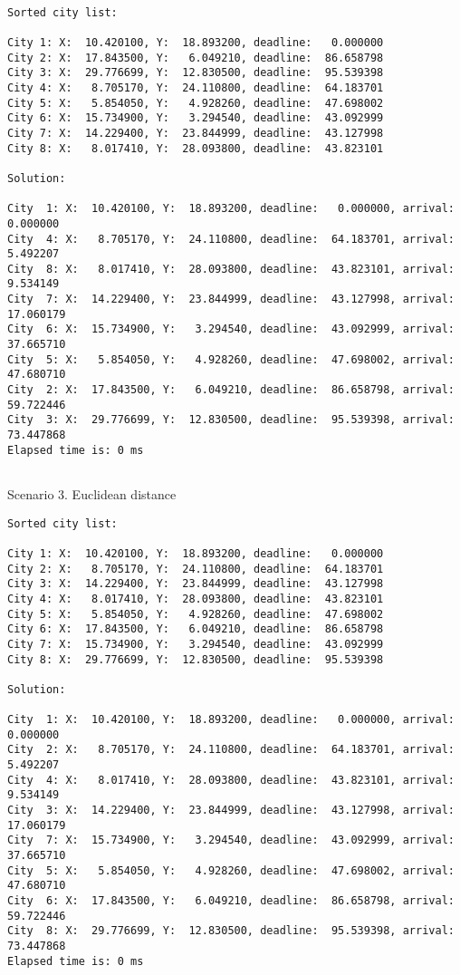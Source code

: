 \documentclass[a4paper, 12pt]{article}
\begin{document}
\begin{lstlisting}

Sorted city list:

City 1: X:  10.420100, Y:  18.893200, deadline:   0.000000
City 2: X:  17.843500, Y:   6.049210, deadline:  86.658798
City 3: X:  29.776699, Y:  12.830500, deadline:  95.539398
City 4: X:   8.705170, Y:  24.110800, deadline:  64.183701
City 5: X:   5.854050, Y:   4.928260, deadline:  47.698002
City 6: X:  15.734900, Y:   3.294540, deadline:  43.092999
City 7: X:  14.229400, Y:  23.844999, deadline:  43.127998
City 8: X:   8.017410, Y:  28.093800, deadline:  43.823101

Solution: 

City  1: X:  10.420100, Y:  18.893200, deadline:   0.000000, arrival:   0.000000
City  4: X:   8.705170, Y:  24.110800, deadline:  64.183701, arrival:   5.492207
City  8: X:   8.017410, Y:  28.093800, deadline:  43.823101, arrival:   9.534149
City  7: X:  14.229400, Y:  23.844999, deadline:  43.127998, arrival:  17.060179
City  6: X:  15.734900, Y:   3.294540, deadline:  43.092999, arrival:  37.665710
City  5: X:   5.854050, Y:   4.928260, deadline:  47.698002, arrival:  47.680710
City  2: X:  17.843500, Y:   6.049210, deadline:  86.658798, arrival:  59.722446
City  3: X:  29.776699, Y:  12.830500, deadline:  95.539398, arrival:  73.447868
Elapsed time is: 0 ms


\end{lstlisting}

Scenario 3. Euclidean distance

\begin{lstlisting}
Sorted city list:

City 1: X:  10.420100, Y:  18.893200, deadline:   0.000000
City 2: X:   8.705170, Y:  24.110800, deadline:  64.183701
City 3: X:  14.229400, Y:  23.844999, deadline:  43.127998
City 4: X:   8.017410, Y:  28.093800, deadline:  43.823101
City 5: X:   5.854050, Y:   4.928260, deadline:  47.698002
City 6: X:  17.843500, Y:   6.049210, deadline:  86.658798
City 7: X:  15.734900, Y:   3.294540, deadline:  43.092999
City 8: X:  29.776699, Y:  12.830500, deadline:  95.539398

Solution: 

City  1: X:  10.420100, Y:  18.893200, deadline:   0.000000, arrival:   0.000000
City  2: X:   8.705170, Y:  24.110800, deadline:  64.183701, arrival:   5.492207
City  4: X:   8.017410, Y:  28.093800, deadline:  43.823101, arrival:   9.534149
City  3: X:  14.229400, Y:  23.844999, deadline:  43.127998, arrival:  17.060179
City  7: X:  15.734900, Y:   3.294540, deadline:  43.092999, arrival:  37.665710
City  5: X:   5.854050, Y:   4.928260, deadline:  47.698002, arrival:  47.680710
City  6: X:  17.843500, Y:   6.049210, deadline:  86.658798, arrival:  59.722446
City  8: X:  29.776699, Y:  12.830500, deadline:  95.539398, arrival:  73.447868
Elapsed time is: 0 ms


\end{lstlisting}
\end{document}
